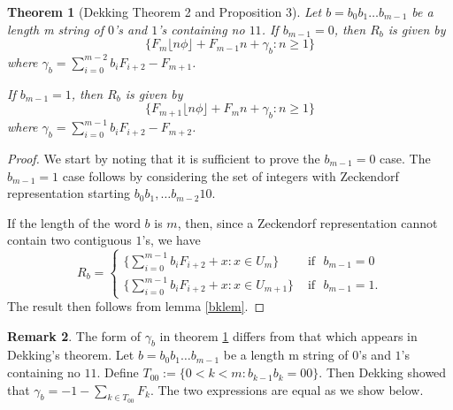 \documentclass[12pt]{article}
\theoremstyle{plain}
\newtheorem{theorem}{Theorem}
\theoremstyle{case}
\theoremstyle{definition}
\newtheorem{remark}[theorem]{Remark}
\begin{document}
\bigskip

\begin{theorem}[Dekking \cite{https://doi.org/10.5281/zenodo.10803363} Theorem 2 and Proposition 3]
\label{dek}
Let $b = b_0 b_1 \dots b_{m-1}$ be a length m string of $0$'s and $1$'s containing no $11$. If $b_{m-1} = 0$, then $R_b$ is given by
$$
\{ F_m \lfloor n \phi \rfloor + F_{m-1} n + \gamma_b : n \geq 1 \} 
$$
where $\gamma_b = \sum_{i=0}^{m-2} b_i F_{i+2} - F_{m+1}$.

If $b_{m-1} = 1$, then $R_b$ is given by
$$
\{ F_{m+1} \lfloor n \phi \rfloor + F_{m} n + \gamma_b : n \geq 1 \} 
$$
where $\gamma_b = \sum_{i=0}^{m-1} b_i F_{i+2} - F_{m+2}$.
\end{theorem}
\begin{proof}
We start by noting that it is sufficient to prove the $b_{m-1} = 0$ case. The $b_{m-1} = 1$ case follows by considering the set of integers with Zeckendorf representation starting $b_0 b_1, \dots b_{m-2} 1 0$.

If the length of the word $b$ is $m$, then, since a Zeckendorf representation cannot contain two contiguous $1$'s, we have 
\begin{equation*}
R_b = 
\begin{cases}
\{  \sum_{i=0}^{m-1} b_i F_{i+2}  + x: x \in U_m \} & \text{   if   }  \,\, b_{m-1} = 0 \\
\{  \sum_{i=0}^{m-1} b_i F_{i+2}  + x: x \in U_{m+1} \} & \text{   if   }  \,\, b_{m-1} = 1 .
\end{cases}
\end{equation*}
The result then follows from lemma \ref{bklem}.
\end{proof}

\bigskip

\begin{remark}
The form of $\gamma_b$ in theorem \ref{dek} differs from that which appears in Dekking's theorem. Let $b = b_0 b_1 \dots b_{m-1}$ be a length m string of $0$'s and $1$'s containing no $11$.  Define $T_{00} := \{0 < k < m : b_{k-1} b_k = 0 0 \}$. Then Dekking showed that $\gamma_b = -1 -  \sum_{k \in T_{00}} F_k$. The two expressions are equal as we show below.
\end{remark}

\bigskip
\end{document}
